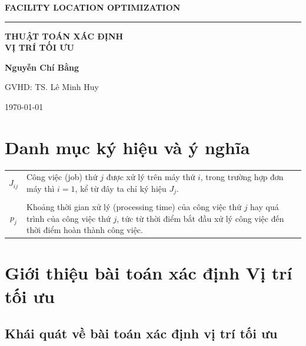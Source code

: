 \documentclass[12pt,a4paper]{report}
\begin{document}
 
    \begin{titlepage}
	\centering
    \phantom{}\par
	\vspace{3cm}
	{\LARGE\textbf{FACILITY LOCATION OPTIMIZATION}\par}
	\vspace{1cm}
	\rule{5cm}{0.5pt}\par
	\vspace{1cm}
		{\LARGE\textbf{THUẬT TOÁN XÁC ĐỊNH \\ VỊ TRÍ TỐI ƯU}\par}
	\vspace{1cm}
	\Large\textbf{Nguyễn Chí Bằng}\par		
	\vspace{1cm}
	\Large{GVHD: TS. Lê Minh Huy}\par		
	\vspace{1cm}
    \today
    \end{titlepage}


	\tableofcontents

	\thispagestyle{empty} %
	\mbox{}

	\chapter*{Danh mục ký hiệu và ý nghĩa}
	\thispagestyle{fancy}
	\begin{tabularx}{\linewidth}{ c  X }
		$J_{ij}$ & Công việc (job) thứ $j$ được xử lý trên máy thứ $i$, trong trường hợp đơn máy thì $i=1$, kể từ đây ta chỉ ký hiệu $J_j$. \\
		\\
		$p_j$ & Khoảng thời gian xử lý (processing time) của công việc thứ $j$ hay quá trình của công việc thứ $j$, tức từ thời điểm bắt đầu xử lý công việc đến thời điểm hoàn thành công việc. \\
	\end{tabularx}
\newpage
{} 

\chapter{Giới thiệu bài toán xác định Vị trí tối ưu}
\section{Khái quát về bài toán xác định vị trí tối ưu}
\end{document}
